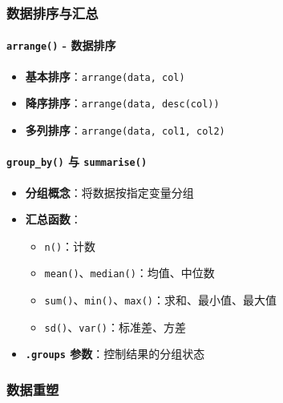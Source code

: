 \documentclass[
]{book}
\providecommand{\tightlist}{%
  \setlength{\itemsep}{0pt}\setlength{\parskip}{0pt}}
\begin{document}
\hypertarget{ux6570ux636eux6392ux5e8fux4e0eux6c47ux603b}{%
\subsubsection{数据排序与汇总}\label{ux6570ux636eux6392ux5e8fux4e0eux6c47ux603b}}

\hypertarget{arrange---ux6570ux636eux6392ux5e8f}{%
\paragraph{\texorpdfstring{\texttt{arrange()} - 数据排序}{arrange() - 数据排序}}\label{arrange---ux6570ux636eux6392ux5e8f}}

\begin{itemize}
\tightlist
\item
  \textbf{基本排序}：\texttt{arrange(data,\ col)}
\item
  \textbf{降序排序}：\texttt{arrange(data,\ desc(col))}
\item
  \textbf{多列排序}：\texttt{arrange(data,\ col1,\ col2)}
\end{itemize}

\hypertarget{group_by-ux4e0e-summarise}{%
\paragraph{\texorpdfstring{\texttt{group\_by()} 与 \texttt{summarise()}}{group\_by() 与 summarise()}}\label{group_by-ux4e0e-summarise}}

\begin{itemize}
\tightlist
\item
  \textbf{分组概念}：将数据按指定变量分组
\item
  \textbf{汇总函数}：

  \begin{itemize}
  \tightlist
  \item
    \texttt{n()}：计数
  \item
    \texttt{mean()}、\texttt{median()}：均值、中位数
  \item
    \texttt{sum()}、\texttt{min()}、\texttt{max()}：求和、最小值、最大值
  \item
    \texttt{sd()}、\texttt{var()}：标准差、方差
  \end{itemize}
\item
  \textbf{\texttt{.groups} 参数}：控制结果的分组状态
\end{itemize}

\hypertarget{ux6570ux636eux91cdux5851}{%
\subsubsection{数据重塑}\label{ux6570ux636eux91cdux5851}}
\end{document}
